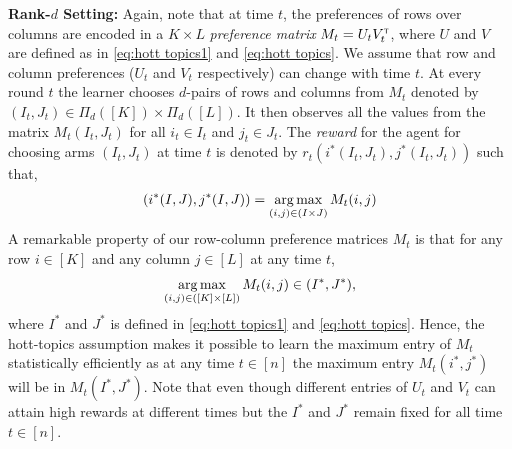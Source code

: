 \textbf{Rank-$d$ Setting:} Again, note that at time $t$, the preferences of rows over columns are encoded in a $K \times L$ \emph{preference matrix} $M_t = U_t V_t^\mathsf{\scriptscriptstyle T}$, where $U$ and $V$ are defined as in \eqref{eq:hott topics1} and \eqref{eq:hott topics}. We assume that row and column preferences ($U_t$ and $V_t$ respectively) can change with time $t$. At every round $t$ the learner chooses $d$-pairs of rows and columns from $M_t$ denoted by $(I_t,J_t)\in \Pi_d([K])\times \Pi_d([L])$. It then observes all the values from the matrix $M_{t}(I_t,J_t)$ for all $i_t\in I_t$ and $j_t \in J_t$. The \emph{reward} for the agent for choosing arms $(I_t,J_t)$ at time $t$ is denoted by $r_t(i^\ast(I_t,J_t),j^\ast(I_t,J_t))$ such that,
\begin{align}
  (i^\ast(I,J),j^\ast(I,J)) = \mathop{\rm arg\,max}_{(i,j) \in (I\times J)} M_{t}(i,j)
  \label{eq:reward}
\end{align}
A remarkable property of our row-column preference matrices $M_t$ is that for any row $i \in [K]$ and any column $j \in [L]$ at any time $t$,
\begin{align}
  \mathop{\rm arg\,max}_{(i, j) \in ([K] \times [L])} M_t(i, j) \in (I^\ast, J^\ast) \label{eq:rewardProp},
\end{align}
where $I^\ast$ and $J^\ast$ is defined in \eqref{eq:hott topics1} and \eqref{eq:hott topics}. Hence, the hott-topics assumption makes it possible to learn the maximum entry of $M_t$ statistically efficiently as at any time $t\in[n]$ the maximum entry $M_t(i^*,j^*)$ will be in $M_t(I^*,J^*)$. Note that even though different entries of $U_t$ and $V_t$ can attain high rewards at different times but the $I^*$ and $J^*$ remain fixed for all time $t\in[n]$. 




